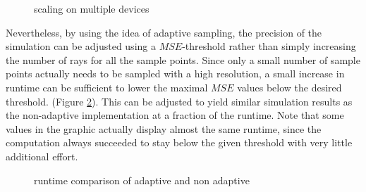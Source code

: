 \begin{figure}[H]
  \centerline{
    }
  \caption{scaling on multiple devices}
  \label{plot:gpu_scaling}
\end{figure}
Nevertheless, by using the idea of adaptive sampling, the precision of the
simulation can be adjusted using a $MSE$-threshold rather than simply increasing
the number of rays for all the sample points. Since only a small number of
sample points actually needs to be sampled with a high resolution, a small
increase in runtime can be sufficient to lower the maximal $MSE$ values below
the desired threshold. (Figure
\ref{plot:adaptive_runtime}). This can be adjusted to yield similar simulation
results as the non-adaptive implementation at a fraction of the runtime. Note
that some values in the graphic actually display almost the same runtime, since
the computation always succeeded to stay below the given threshold with very
little additional effort.
\begin{figure}[H]
  \centerline{
    }
  \caption{runtime comparison of adaptive and non adaptive }
  \label{plot:adaptive_runtime}
\end{figure}
